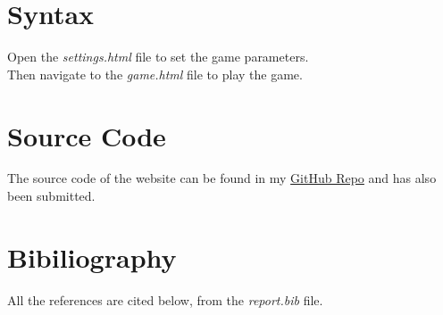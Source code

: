 \documentclass{article}
\begin{document}
\newpage

\section{Syntax}

Open the \textit{settings.html} file to set the game parameters. \\

\noindent
Then navigate to the \textit{game.html} file to play the game.

\section{Source Code}
The source code of the website can be found in my \href{https://github.com/SuperSat001/CS104-Project}{GitHub Repo} and has also been submitted.

\section{Bibiliography}

All the references are cited below, from the \textit{report.bib} file.

\cite{minesweeper} \cite{slider} \cite{confetti} \cite{navbar}

\printbibliography
\end{document}

